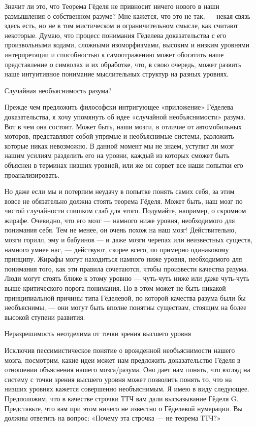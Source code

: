 \documentclass[../main.tex]{subfiles}
\begin{document}
Значит ли это, что Теорема Гёделя не привносит ничего нового в наши размышления о собственном разуме? Мне кажется, что это не так, --- некая связь здесь есть, но не в том мистическом и ограничительном смысле, как считают некоторые. Думаю, что процесс понимания Гёделева доказательства с его произвольными кодами, сложными изоморфизмами, высоким и низким уровнями интерпретации и способностью к самоотражению может обогатить наше представление о символах и их обработке, что, в свою очередь, может развить наше интуитивное понимание мыслительных структур на разных уровнях.

Случайная необъяснимость разума?

Прежде чем предложить философски интригующее «приложение» Гёделева доказательства, я хочу упомянуть об идее «случайной необъяснимости» разума. Вот в чем она состоит. Может быть, наши мозги, в отличие от автомобильных моторов, представляют собой упрямые и необъяснимые системы, разложить которые никак невозможно. В данной момент мы не знаем, уступит ли мозг нашим усилиям разделить его на уровни, каждый из которых сможет быть объяснен в терминах низших уровней, или же он сорвет все наши попытки его проанализировать.

Но даже если мы и потерпим неудачу в попытке понять самих себя, за этим вовсе не обязательно должна стоять теорема Гёделя. Может быть, наш мозг по чистой случайности слишком слаб для этого. Подумайте, например, о скромном жирафе. Очевидно, что его мозг --- намного ниже уровня, необходимого для понимания себя. Тем не менее, он очень похож на наш мозг! Действительно, мозги горилл, эму и бабуинов --- и даже мозги черепах или неизвестных существ, намного умнее нас, --- действуют, скорее всего, по примерно одинаковому принципу. Жирафы могут находиться намного ниже уровня, необходимого для понимания того, как эти правила сочетаются, чтобы произвести качества разума. Люди могут стоять ближе к этому уровню --- чуть-чуть ниже или даже чуть-чуть выше критического порога понимания. Но в этом может не быть никакой принципиальной причины типа Гёделевой, по которой качества разума были бы необъяснимы, --- они могут быть вполне понятны существам, стоящим на более высокой ступени развития.

Неразрешимость неотделима от точки зрения высшего уровня

Исключив пессимистическое понятие о врожденной необъяснимости нашего мозга, посмотрим, какие идеи может нам предложить доказательство Гёделя в отношении объяснения нашего мозга/разума. Оно дает нам понять, что взгляд на систему с точки зрения высшего уровня может позволить понять то, что на низших уровнях кажется совершенно необъяснимым. Я имею в виду следующее. Предположим, что в качестве строчки ТТЧ вам дали высказывание Гёделя G. Представьте, что вам при этом ничего не известно о Гёделевой нумерации. Вы должны ответить на вопрос: «Почему эта строчка --- не теорема ТТЧ?»
\end{document}
